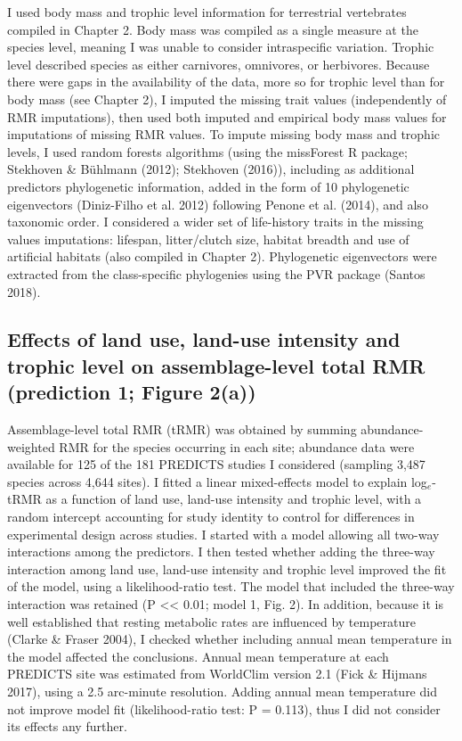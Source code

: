 I used body mass and trophic level information for terrestrial vertebrates compiled in Chapter 2. Body mass was compiled as a single measure at the species level, meaning I was unable to consider intraspecific variation. Trophic level described species as either carnivores, omnivores, or herbivores. Because there were gaps in the availability of the data, more so for trophic level than for body mass (see Chapter 2), I imputed the missing trait values (independently of RMR imputations), then used both imputed and empirical body mass values for imputations of missing RMR values. To impute missing body mass and trophic levels, I used random forests algorithms (using the missForest R package; Stekhoven \& Bühlmann (2012); Stekhoven (2016)), including as additional predictors phylogenetic information, added in the form of 10 phylogenetic eigenvectors (Diniz-Filho et al. 2012) following Penone et al. (2014), and also taxonomic order. I considered a wider set of life-history traits in the missing values imputations: lifespan, litter/clutch size, habitat breadth and use of artificial habitats (also compiled in Chapter 2). Phylogenetic eigenvectors were extracted from the class-specific phylogenies using the PVR package (Santos 2018).  

\subsection{Effects of land use, land-use intensity and trophic level on assemblage-level total RMR (prediction 1; Figure 2(a))}

Assemblage-level total RMR (tRMR) was obtained by summing abundance-weighted RMR for the species occurring in each site; abundance data were available for 125 of the 181 PREDICTS studies I considered (sampling 3,487 species across 4,644 sites). I fitted a linear mixed-effects model to explain log$_e$-tRMR as a function of land use, land-use intensity and trophic level, with a random intercept accounting for study identity to control for differences in experimental design across studies. I started with a model allowing all two-way interactions among the predictors. I then tested whether adding the three-way interaction among land use, land-use intensity and trophic level improved the fit of the model, using a likelihood-ratio test. The model that included the three-way interaction was retained (P << 0.01; model 1, Fig. 2). In addition, because it is well established that resting metabolic rates are influenced by temperature (Clarke \& Fraser 2004), I checked whether including annual mean temperature in the model affected the conclusions. Annual mean temperature at each PREDICTS site was estimated from WorldClim version 2.1 (Fick \& Hijmans 2017), using a 2.5 arc-minute resolution. Adding annual mean temperature did not improve model fit (likelihood-ratio test: P = 0.113), thus I did not consider its effects any further.   

